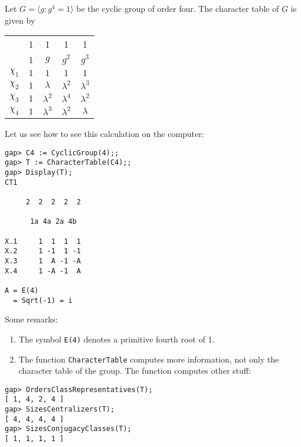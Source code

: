 \begin{example}
	Let $G=\langle g:g^4=1\rangle$ 
	be the cyclic group of order four. The character table of $G$ is given by
	\begin{center}
		\begin{tabular}{|c|cccc|}
			\hline 
			& 1 & 1 & 1 & 1\tabularnewline
			& $1$ & $g$ & $g^2$ & $g^{3}$\tabularnewline
			\hline 
			$\chi_{1}$ & $1$ & $1$ & $1$ & $1$\tabularnewline
			$\chi_{2}$ & $1$ & $\lambda$ & $\lambda^2$ & $\lambda^{3}$\tabularnewline
			$\chi_{3}$ & $1$ & $\lambda^2$ & $\lambda^4$ & $\lambda^{2}$\tabularnewline
			$\chi_{4}$ & $1$ & $\lambda^{3}$ & $\lambda^{2}$ & $\lambda$\tabularnewline
			\hline
		\end{tabular}
	\end{center}
 Let us see how to see this calculation on the computer:
\begin{lstlisting}
gap> C4 := CyclicGroup(4);;                       
gap> T := CharacterTable(C4);;
gap> Display(T);
CT1

     2  2  2  2  2

      1a 4a 2a 4b

X.1     1  1  1  1
X.2     1 -1  1 -1
X.3     1  A -1 -A
X.4     1 -A -1  A

A = E(4)
  = Sqrt(-1) = i
\end{lstlisting}
%
%
%                   
%                   
%
%
%                
%                
Some remarks: 
 \begin{enumerate}
     \item The symbol \lstinline{E(4)} denotes a primitive fourth root of 1.
     \item The function \lstinline{CharacterTable} computes more information, not only the character table of the group. 
     The function computes other stuff: 
 \end{enumerate}
%
%
\begin{lstlisting}
gap> OrdersClassRepresentatives(T);
[ 1, 4, 2, 4 ]
gap> SizesCentralizers(T);
[ 4, 4, 4, 4 ]
gap> SizesConjugacyClasses(T);
[ 1, 1, 1, 1 ]
\end{lstlisting}
\end{example}

